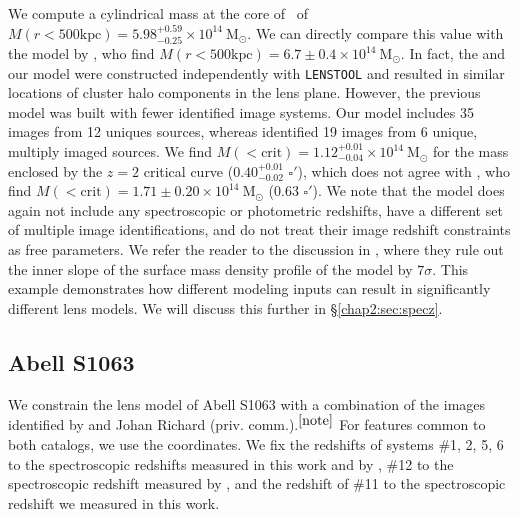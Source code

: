 We compute a cylindrical mass at the core of \MACSeleven\ of $M(r<500\mathrm{kpc})=5.98^{+0.59}_{-0.25}\times10^{14}\ \mathrm{M_\odot}$. We can directly compare this value with the model by \citet{Smith:2009lr}, who find $M(r<500\mathrm{kpc})=6.7\pm0.4\times10^{14}\ \mathrm{M_\odot}$. In fact, the \citet{Smith:2009lr} and our model were constructed independently with \texttt{LENSTOOL} and resulted in similar locations of cluster halo components in the lens plane. However, the previous model was built with fewer identified image systems. Our model includes 35 images from 12 uniques sources, whereas \citet{Smith:2009lr} identified 19 images from 6 unique, multiply imaged sources. We find $M(<\mathrm{crit})=1.12^{+0.01}_{-0.04}\times10^{14}\ \mathrm{M_\odot}$ for the mass enclosed by the $z=2$ critical curve ($0.40^{+0.01}_{-0.02}$ $\square'$), which does not agree with \citet{Zitrin:2011qy}, who find $M(<\mathrm{crit})=1.71\pm0.20\times10^{14}\ \mathrm{M_\odot}$ (0.63 $\square'$). We note that the \citet{Zitrin:2011qy} model does again not include any spectroscopic or photometric redshifts, have a different set of multiple image identifications, and do not treat their image redshift constraints as free parameters. We refer the reader to the discussion in \citet{Smith:2009lr}, where they rule out the inner slope of the surface mass density profile of the \citet{Zitrin:2011qy} model by $7\sigma$. This example demonstrates how different modeling inputs can result in significantly different lens models. We will discuss this further in \S \ref{chap2:sec:specz}.

\subsection{Abell S1063}
\label{chap2:sec:results_as1063}

We constrain the lens model of Abell S1063 with a combination of the images identified by \citet{Monna:2014lr} and Johan Richard (priv. comm.).$^{\ref{note}}$ For features common to both catalogs, we use the \citet{Monna:2014lr} coordinates. We fix the redshifts of systems \#1, 2, 5, 6 to the spectroscopic redshifts measured in this work and by  \citet{Richard:2014gf}, \#12 to the spectroscopic redshift measured by \citet{Balestra:2013uq,Boone:2013lr}, and the redshift of \#11 to the spectroscopic redshift we measured in this work.

